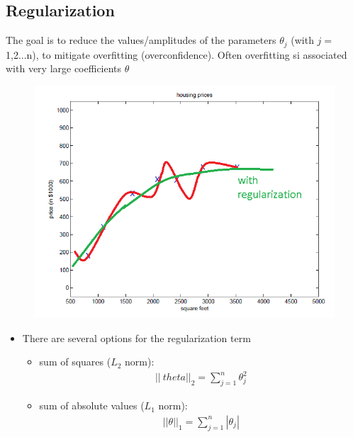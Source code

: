 \documentclass[a4paper,12pt]{report}
\begin{document}
\subsection{Regularization}
The goal is to reduce the values/amplitudes of the parameters $\theta_j$ (with $j=$1,2...n), to mitigate overfitting (overconfidence). Often overfitting si associated with very large coefficients $\theta$
\begin{figure}[H]
\centering
        \includegraphics[totalheight=6 cm]{overfittingregularization.png}
\end{figure}
\begin{itemize}
\item There are several options for the regularization term
	\begin{itemize}
		\item sum of squares ($L_2$ norm):
		\begin{align}
		|| \ theta ||_2 = \sum _{j=1} ^{n} \theta_j ^2
		\end{align}
				\item sum of absolute values ($L_1$ norm):
		\begin{align}
		|| \theta ||_1 = \sum _{j=1} ^{n} |\theta_j|
		\end{align}
	\end{itemize}
\end{itemize}
\end{document}
